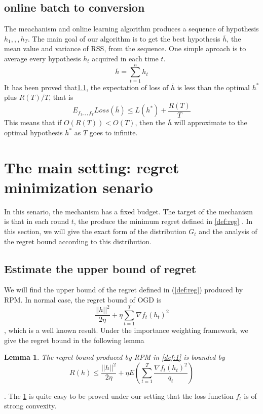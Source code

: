 \documentclass[10pt,conference,compsocconf,letterpaper]{IEEEtran}
\newtheorem{Lemma}{Lemma}
\begin{document}
\subsection{online batch to conversion}
The meachanism and online learning algorithm produces a sequence of hypothesis $h_1,,,h_T$. The main goal of our algorithm is to get the best hypothesis $\overline{h}$, the mean value and variance of RSS, from the sequence. One simple aproach is to average every hypothesis $h_t$ acquired in each time $t$.
\begin{equation}
\overline{h}=\sum_{t=1}^n h_t
\end{equation}
It has been proved that\ref{}, the expectation of loss of $\overline{h}$ is less than the optimal $h^*$ plus $R(T)/T$, that is 
\begin{equation*}
E_{f_1,,,f_T}Loss(\overline{h})\leq L(h^*)+\frac{R(T)}{T}
\end{equation*}
This means that if $O(R(T))<O(T)$, then the $\overline{h}$ will approximate to the optimal hypothesis $h^*$ as $T$ goes to infinite.
\section{The main setting: regret minimization senario}\label{mainsolution}
In this senario, the mechanism has a fixed budget. The target of the mechanism is that in each round $t$, the  produce the minimum regret defined in \ref{def:reg} . In this section, we will give the exact form of the distribution $G_t$ and the analysis of the regret bound according to this distribution. 
\subsection{Estimate the upper bound of regret}
We will find the upper bound of the regret defined in (\ref{def:reg}) produced by RPM. In normal case, the regret bound of OGD is 
\begin{equation}
\frac{||h||^2}{2\eta}+\eta \sum_{t=1}^T\nabla f_t(h_t)^2
\end{equation}
, which is a well known result. Under the importance weighting framework, we give the regret bound in the following lemma
\begin{Lemma}\label{lemma:reg}
The regret bound produced by RPM in \ref{def:1} is bounded by
\begin{equation}
R(h)\leq \frac{||h||^2}{2\eta}+\eta E(\sum_{t=1}^T\frac{\nabla f_t(h_t)^2}{q_t})
\end{equation}
\end{Lemma}
. The \ref{lemma:reg} is quite easy to be proved under our setting that the loss function $f_t$ is of strong convexity.
\end{document}
